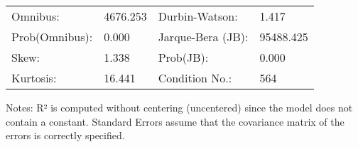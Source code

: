 \begin{table}
\begin{center}
\begin{tabular}{llll}
\hline
Omnibus:       & 4676.253 & Durbin-Watson:    & 1.417      \\
Prob(Omnibus): & 0.000    & Jarque-Bera (JB): & 95488.425  \\
Skew:          & 1.338    & Prob(JB):         & 0.000      \\
Kurtosis:      & 16.441   & Condition No.:    & 564        \\
\hline
\end{tabular}
\end{center}
\end{table}
\bigskip
Notes: \newline 
[1] R² is computed without centering (uncentered) since the                 model does not contain a constant. \newline 
[2] Standard Errors assume that the covariance matrix of the errors is correctly specified.